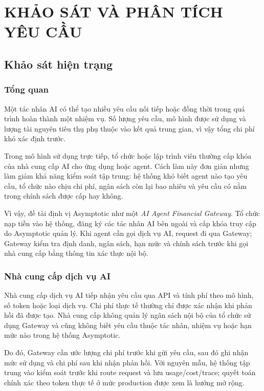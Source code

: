 \chapter{KHẢO SÁT VÀ PHÂN TÍCH YÊU CẦU}

\section{Khảo sát hiện trạng}

\subsection*{Tổng quan}

Một tác nhân AI có thể tạo nhiều yêu cầu nối tiếp hoặc đồng thời trong quá trình hoàn thành một nhiệm vụ. Số lượng yêu cầu, mô hình được sử dụng và lượng tài nguyên tiêu thụ phụ thuộc vào kết quả trung gian, vì vậy tổng chi phí khó xác định trước.

Trong mô hình sử dụng trực tiếp, tổ chức hoặc lập trình viên thường cấp khóa của nhà cung cấp AI cho ứng dụng hoặc agent. Cách làm này đơn giản nhưng làm giảm khả năng kiểm soát tập trung: hệ thống khó biết agent nào tạo yêu cầu, tổ chức nào chịu chi phí, ngân sách còn lại bao nhiêu và yêu cầu có nằm trong chính sách được cấp hay không.

Vì vậy, đề tài định vị Asymptotic như một \textit{AI Agent Financial Gateway}. Tổ chức nạp tiền vào hệ thống, đăng ký các tác nhân AI bên ngoài và cấp khóa truy cập do Asymptotic quản lý. Khi agent cần gọi dịch vụ AI, request đi qua Gateway; Gateway kiểm tra định danh, ngân sách, hạn mức và chính sách trước khi gọi nhà cung cấp bằng thông tin xác thực nội bộ.


\subsection*{Nhà cung cấp dịch vụ AI}

Nhà cung cấp dịch vụ AI tiếp nhận yêu cầu qua API và tính phí theo mô hình, số token hoặc loại dịch vụ. Chi phí thực tế thường chỉ được xác nhận khi phản hồi đã được tạo. Nhà cung cấp không quản lý ngân sách nội bộ của tổ chức sử dụng Gateway và cũng không biết yêu cầu thuộc tác nhân, nhiệm vụ hoặc hạn mức nào trong hệ thống Asymptotic.

Do đó, Gateway cần ước lượng chi phí trước khi gửi yêu cầu, sau đó ghi nhận mức sử dụng và chi phí sau khi nhận phản hồi. Với nguyên mẫu, hệ thống tập trung vào kiểm soát trước khi route request và lưu usage/cost/trace; quyết toán chính xác theo token thực tế ở mức production được xem là hướng mở rộng.

